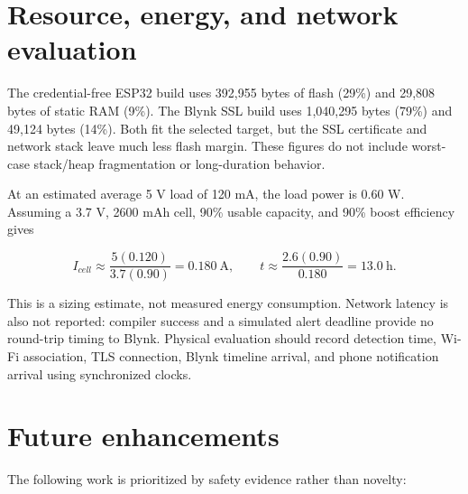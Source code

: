 \documentclass[12pt,a4paper]{article}
\begin{document}
\section{Resource, energy, and network evaluation}

The credential-free ESP32 build uses 392,955 bytes of flash (29\%) and 29,808
bytes of static RAM (9\%). The Blynk SSL build uses 1,040,295 bytes (79\%) and
49,124 bytes (14\%). Both fit the selected target, but the SSL certificate and
network stack leave much less flash margin. These figures do not include
worst-case stack/heap fragmentation or long-duration behavior.

At an estimated average 5 V load of 120 mA, the load power is 0.60 W. Assuming
a 3.7 V, 2600 mAh cell, 90\% usable capacity, and 90\% boost efficiency gives

\begin{equation}
 I_{cell}\approx\frac{5(0.120)}{3.7(0.90)}=0.180\ \mathrm{A},\qquad
 t\approx\frac{2.6(0.90)}{0.180}=13.0\ \mathrm{h}.
\end{equation}

This is a sizing estimate, not measured energy consumption. Network latency is
also not reported: compiler success and a simulated alert deadline provide no
round-trip timing to Blynk. Physical evaluation should record detection time,
Wi-Fi association, TLS connection, Blynk timeline arrival, and phone
notification arrival using synchronized clocks.

\section{Future enhancements}
\label{sec:future}

The following work is prioritized by safety evidence rather than novelty:
\end{document}
